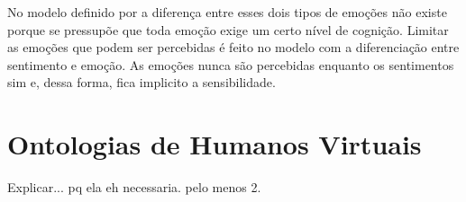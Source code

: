No modelo definido por \citet{ortony1988cse} a diferença entre esses dois
tipos de emoções não existe porque se pressupõe que toda emoção exige um certo
nível de cognição. Limitar as emoções que podem ser percebidas é feito no
modelo com a diferenciação entre sentimento e emoção. As emoções nunca são
percebidas enquanto os sentimentos sim e, dessa forma, fica implicito a
sensibilidade.




\section{Ontologias de Humanos Virtuais} \label{cap:eda:odhv}

Explicar...
	pq ela eh necessaria.
	pelo menos 2.
